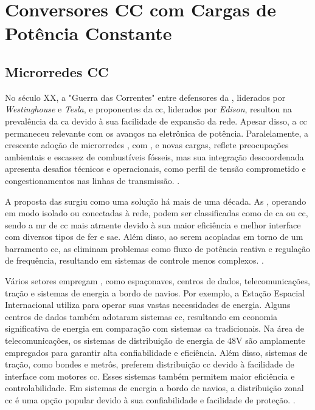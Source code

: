 \chapter{Conversores CC com Cargas de Potência Constante} \label{cap3}

\section{Microrredes CC}

No século XX, a "Guerra das Correntes" entre defensores da , liderados por \textit{Westinghouse} e \textit{Tesla}, e proponentes da \acrshort{cc}, liderados por \textit{Edison}, resultou na prevalência da \acrshort{ca} devido à sua facilidade de expansão da rede. Apesar disso, a \acrshort{cc} permaneceu relevante com os avanços na eletrônica de potência. Paralelamente, a crescente adoção de microrredes , com ,  e novas cargas, reflete preocupações ambientais e escassez de combustíveis fósseis, mas sua integração descoordenada apresenta desafios técnicos e operacionais, como perfil de tensão comprometido e congestionamentos nas linhas de transmissão. \cite{Elsayed2015, Dragicevic2015}.

A proposta das  surgiu como uma solução há mais de uma década. As , operando em modo isolado ou conectadas à rede, podem ser classificadas como  de \acrshort{ca} ou \acrshort{cc}, sendo a \acrshort{mr} de \acrshort{cc} mais atraente devido à sua maior eficiência e melhor interface com diversos tipos de \acrshort{fer} e \acrshort{sae}. Além disso, ao serem acopladas em torno de um barramento \acrshort{cc}, as  eliminam problemas como fluxo de potência reativa e regulação de frequência, resultando em sistemas de controle menos complexos. \cite{Dragicevic2015}.

Vários setores empregam , como espaçonaves, centros de dados, telecomunicações, tração e sistemas de energia a bordo de navios. Por exemplo, a Estação Espacial Internacional utiliza  para operar suas vastas necessidades de energia. Alguns centros de dados também adotaram sistemas \acrshort{cc}, resultando em economia significativa de energia em comparação com sistemas \acrshort{ca} tradicionais. Na área de telecomunicações, os sistemas de distribuição de energia de 48V são amplamente empregados para garantir alta confiabilidade e eficiência. Além disso, sistemas de tração, como bondes e metrôs, preferem distribuição \acrshort{cc} devido à facilidade de interface com motores \acrshort{cc}. Esses sistemas também permitem maior eficiência e controlabilidade. Em sistemas de energia a bordo de navios, a distribuição zonal \acrshort{cc} é uma opção popular devido à sua confiabilidade e facilidade de proteção. \cite{Elsayed2015}.

